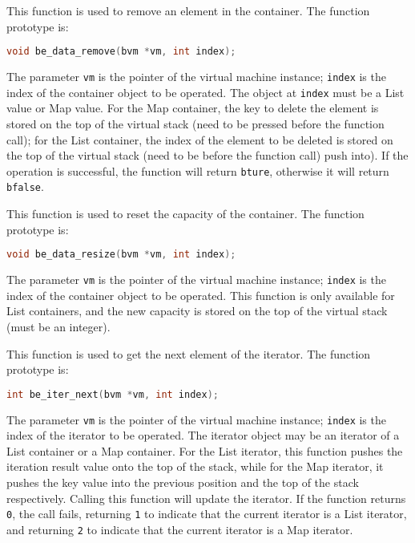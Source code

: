 This function is used to remove an element in the container. The function prototype is:
\begin{lstlisting}[language=c, style=berry, numbers=none]
void be_data_remove(bvm *vm, int index);
\end{lstlisting}
The parameter \texttt{vm} is the pointer of the virtual machine instance; \texttt{index} is the index of the container object to be operated. The object at \texttt{index} must be a List value or Map value. For the Map container, the key to delete the element is stored on the top of the virtual stack (need to be pressed before the function call); for the List container, the index of the element to be deleted is stored on the top of the virtual stack (need to be before the function call) push into). If the operation is successful, the function will return \texttt{bture}, otherwise it will return \texttt{bfalse}.


This function is used to reset the capacity of the container. The function prototype is:
\begin{lstlisting}[language=c, style=berry, numbers=none]
void be_data_resize(bvm *vm, int index);
\end{lstlisting}
The parameter \texttt{vm} is the pointer of the virtual machine instance; \texttt{index} is the index of the container object to be operated. This function is only available for List containers, and the new capacity is stored on the top of the virtual stack (must be an integer).


This function is used to get the next element of the iterator. The function prototype is:
\begin{lstlisting}[language=c, style=berry, numbers=none]
int be_iter_next(bvm *vm, int index);
\end{lstlisting}
The parameter \texttt{vm} is the pointer of the virtual machine instance; \texttt{index} is the index of the iterator to be operated. The iterator object may be an iterator of a List container or a Map container. For the List iterator, this function pushes the iteration result value onto the top of the stack, while for the Map iterator, it pushes the key value into the previous position and the top of the stack respectively. Calling this function will update the iterator. If the function returns \texttt{0}, the call fails, returning \texttt{1} to indicate that the current iterator is a List iterator, and returning \texttt{2} to indicate that the current iterator is a Map iterator.

